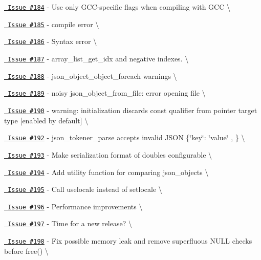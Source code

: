 \begin{DoxyItemize}
\item \href{https://github.com/json-c/json-c/issues/184}{\texttt{ Issue \#184}} -\/ Use only GCC-\/specific flags when compiling with GCC \textbackslash{}
\item \href{https://github.com/json-c/json-c/issues/185}{\texttt{ Issue \#185}} -\/ compile error \textbackslash{}
\item \href{https://github.com/json-c/json-c/issues/186}{\texttt{ Issue \#186}} -\/ Syntax error \textbackslash{}
\item \href{https://github.com/json-c/json-c/issues/187}{\texttt{ Issue \#187}} -\/ array\+\_\+list\+\_\+get\+\_\+idx and negative indexes. \textbackslash{}
\item \href{https://github.com/json-c/json-c/issues/188}{\texttt{ Issue \#188}} -\/ json\+\_\+object\+\_\+object\+\_\+foreach warnings \textbackslash{}
\item \href{https://github.com/json-c/json-c/issues/189}{\texttt{ Issue \#189}} -\/ noisy json\+\_\+object\+\_\+from\+\_\+file\+: error opening file \textbackslash{}
\item \href{https://github.com/json-c/json-c/issues/190}{\texttt{ Issue \#190}} -\/ warning\+: initialization discards const qualifier from pointer target type \mbox{[}enabled by default\mbox{]} \textbackslash{}
\item \href{https://github.com/json-c/json-c/issues/192}{\texttt{ Issue \#192}} -\/ json\+\_\+tokener\+\_\+parse accepts invalid JSON \{\char`\"{}key\char`\"{}\+: \char`\"{}value\char`\"{} , \} \textbackslash{}
\item \href{https://github.com/json-c/json-c/issues/193}{\texttt{ Issue \#193}} -\/ Make serialization format of doubles configurable \textbackslash{}
\item \href{https://github.com/json-c/json-c/issues/194}{\texttt{ Issue \#194}} -\/ Add utility function for comparing json\+\_\+objects \textbackslash{}
\item \href{https://github.com/json-c/json-c/issues/195}{\texttt{ Issue \#195}} -\/ Call uselocale instead of setlocale \textbackslash{}
\item \href{https://github.com/json-c/json-c/issues/196}{\texttt{ Issue \#196}} -\/ Performance improvements \textbackslash{}
\item \href{https://github.com/json-c/json-c/issues/197}{\texttt{ Issue \#197}} -\/ Time for a new release? \textbackslash{}
\item \href{https://github.com/json-c/json-c/issues/198}{\texttt{ Issue \#198}} -\/ Fix possible memory leak and remove superfluous NULL checks before free() \textbackslash{}

\end{DoxyItemize}
